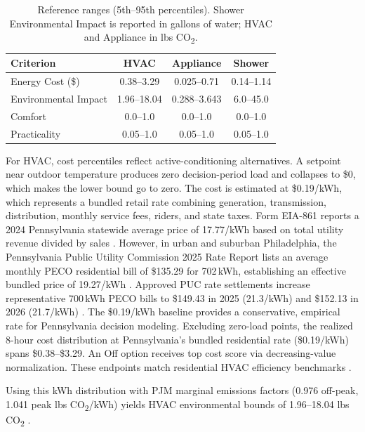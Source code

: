 \documentclass[a4paper,fleqn]{cas-dc}
\begin{document}
\begin{table}[H]
\begin{threeparttable}
\centering
\small
\caption{Reference ranges (5th--95th percentiles). Shower Environmental Impact is reported in gallons of water; HVAC and Appliance in lbs CO\textsubscript{2}.}
\label{table:reference_ranges}
\begin{tabular}{@{}lccc@{}}
\toprule
\textbf{Criterion} & \textbf{HVAC} & \textbf{Appliance} & \textbf{Shower} \\
\midrule
Energy Cost (\$) & 0.38--3.29 & 0.025--0.71 & 0.14--1.14 \\
Environmental Impact & 1.96--18.04 & 0.288--3.643 & 6.0--45.0 \\
Comfort & 0.0--1.0 & 0.0--1.0 & 0.0--1.0 \\
Practicality & 0.05--1.0 & 0.05--1.0 & 0.05--1.0 \\
\bottomrule
\end{tabular}
\end{threeparttable}
\end{table}

For HVAC, cost percentiles reflect active-conditioning alternatives. A setpoint near outdoor temperature produces zero decision-period load and collapses to \$0, which makes the lower bound go to zero. The cost is estimated at \$0.19/kWh, which represents a bundled retail rate combining generation, transmission, distribution, monthly service fees, riders, and state taxes. Form EIA-861 reports a 2024 Pennsylvania statewide average price of 17.77\textcent/kWh based on total utility revenue divided by sales \citep{eia_epa_2024}. However, in urban and suburban Philadelphia, the Pennsylvania Public Utility Commission 2025 Rate Report lists an average monthly PECO residential bill of \$135.29 for 702\,kWh, establishing an effective bundled price of 19.27\textcent/kWh \citep{paupc2025}. Approved PUC rate settlements increase representative 700\,kWh PECO bills to \$149.43 in 2025 (21.3\textcent/kWh) and \$152.13 in 2026 (21.7\textcent/kWh) \citep{paupc2024dec}. The \$0.19/kWh baseline provides a conservative, empirical rate for Pennsylvania decision modeling. Excluding zero-load points, the realized 8-hour cost distribution at Pennsylvania's bundled residential rate (\$0.19/kWh) \citep{eia_epa_2024,paupc2025,paupc2024dec} spans \$0.38--\$3.29.  An Off option receives top cost score via decreasing-value normalization. These endpoints match residential HVAC efficiency benchmarks \citep{synapse2013,parker2018}.

Using this kWh distribution with PJM marginal emissions factors (0.976 off-peak, 1.041 peak lbs CO\textsubscript{2}/kWh) yields HVAC environmental bounds of 1.96--18.04 lbs CO\textsubscript{2} \citep{pjm2022emissions}.
\end{document}
